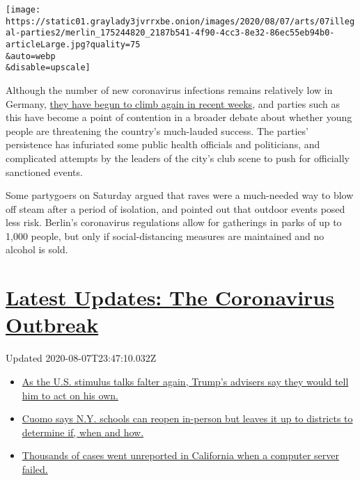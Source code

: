 \texttt{[image: https://static01.graylady3jvrrxbe.onion/images/2020/08/07/arts/07illegal-parties2/merlin\_175244820\_2187b541-4f90-4cc3-8e32-86ec55eb94b0-articleLarge.jpg?quality=75\\\&auto=webp\\\&disable=upscale]}

Although the number of new coronavirus infections remains relatively low
in Germany,
\href{https://www.nytimes3xbfgragh.onion/interactive/2020/world/europe/germany-coronavirus-cases.html}{they
have begun to climb again in recent weeks}, and parties such as this
have become a point of contention in a broader debate about whether
young people are threatening the country's much-lauded success. The
parties' persistence has infuriated some public health officials and
politicians, and complicated attempts by the leaders of the city's club
scene to push for officially sanctioned events.

Some partygoers on Saturday argued that raves were a much-needed way to
blow off steam after a period of isolation, and pointed out that outdoor
events posed less risk. Berlin's coronavirus regulations allow for
gatherings in parks of up to 1,000 people, but only if social-distancing
measures are maintained and no alcohol is sold.

\hypertarget{latest-updates-the-coronavirus-outbreak}{%
\section{\texorpdfstring{\href{https://www.nytimes3xbfgragh.onion/2020/08/07/world/covid-19-news.html?action=click\&pgtype=Article\&state=default\&region=MAIN_CONTENT_1\&context=storylines_live_updates}{Latest
Updates: The Coronavirus
Outbreak}}{Latest Updates: The Coronavirus Outbreak}}\label{latest-updates-the-coronavirus-outbreak}}

Updated 2020-08-07T23:47:10.032Z

\begin{itemize}
\tightlist
\item
  \href{https://www.nytimes3xbfgragh.onion/2020/08/07/world/covid-19-news.html?action=click\&pgtype=Article\&state=default\&region=MAIN_CONTENT_1\&context=storylines_live_updates\#link-232a7bee}{As
  the U.S. stimulus talks falter again, Trump's advisers say they would
  tell him to act on his own.}
\item
  \href{https://www.nytimes3xbfgragh.onion/2020/08/07/world/covid-19-news.html?action=click\&pgtype=Article\&state=default\&region=MAIN_CONTENT_1\&context=storylines_live_updates\#link-3f64a70a}{Cuomo
  says N.Y. schools can reopen in-person but leaves it up to districts
  to determine if, when and how.}
\item
  \href{https://www.nytimes3xbfgragh.onion/2020/08/07/world/covid-19-news.html?action=click\&pgtype=Article\&state=default\&region=MAIN_CONTENT_1\&context=storylines_live_updates\#link-14e70066}{Thousands
  of cases went unreported in California when a computer server failed.}
\end{itemize}

